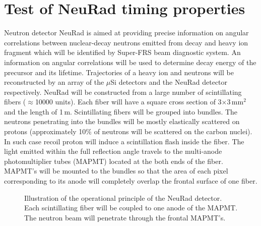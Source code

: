 \documentclass{webofc}
\begin{document}
\section{Test of NeuRad timing properties}
Neutron detector NeuRad is aimed at providing precise information on angular correlations between nuclear-decay neutrons emitted from decay and heavy ion fragment which will be identified by Super-FRS beam diagnostic system. An information on angular correlations will be used to determine decay energy of the precursor and its lifetime. Trajectories of a heavy ion and neutrons will be reconstructed by an array of the $\mu$Si detectors and the NeuRad detector respectively. %
NeuRad will be constructed from a large number of scintillating fibers ($\approx$10000 units). Each fiber will have a square cross section of 3$\times$3\,mm$^2$ and the length of 1\,m. Scintillating fibers will be grouped into bundles. 
The neutrons penetrating into the bundles will be mostly elastically scattered on protons (approximately 10\% of neutrons will be scattered on the carbon nuclei). In such case recoil proton will induce a scintillation flash inside the fiber. The light emitted within the full reflection angle travels to the multi-anode photomultiplier tubes (MAPMT) located at the both ends of the fiber.
MAPMT's will be mounted to the bundles so that the area of each pixel corresponding to its anode will completely overlap the frontal surface of one fiber.

\begin{figure}[h]
	\caption{Illustration of the operational principle of the NeuRad detector. Each scintillating fiber will be coupled to one anode of the MAPMT. The neutron beam will penetrate through the frontal MAPMT's.}
	\label{ris:neuradPrinciple}
\end{figure}
\end{document}
